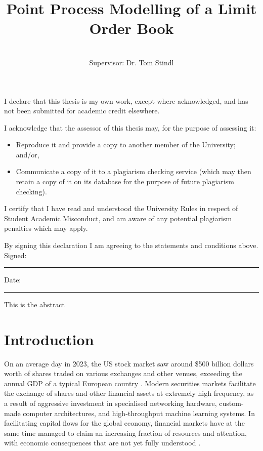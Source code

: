 \documentclass[honours,12pt]{unswthesis}
\title{Point Process Modelling of a Limit Order Book}
\author{\Authornameonly\\{\bigskip}Supervisor: Dr. Tom Stindl}
\newcommand\blankpage{%
    \null
    \thispagestyle{empty}%
    \addtocounter{page}{-1}%
    \newpage}
\numberwithin{equation}{section}
\begin{document}
\beforepreface

\afterpage{\blankpage}



\vskip 10pc \noindent I declare that this thesis is my
own work, except where acknowledged, and has not been submitted for
academic credit elsewhere. 

\vskip 2pc  \noindent I acknowledge that the assessor of this
thesis may, for the purpose of assessing it:
\begin{itemize}
\item Reproduce it and provide a copy to another member of the University; and/or,
\item Communicate a copy of it to a plagiarism checking service (which may then retain a copy of it on its database for the purpose of future plagiarism checking).
\end{itemize}

\vskip 2pc \noindent I certify that I have read and understood the University Rules in
respect of Student Academic Misconduct, and am aware of any potential plagiarism penalties which may 
apply.\vspace{24pt}

\vskip 2pc \noindent By signing 
this declaration I am
agreeing to the statements and conditions above.
\vskip 2pc \noindent
Signed: \rule{7cm}{0.25pt} \hfill Date: \rule{4cm}{0.25pt} \newline
\vskip 1pc

\afterpage{\blankpage}




\afterpage{\blankpage}



This is the abstract
\afterpage{\blankpage}


\afterpreface

\afterpage{\blankpage}

\chapter{Introduction}\label{s-intro}

On an average day in 2023, the US stock market saw around \$500 billion dollars worth of shares traded on various exchanges and other venues, exceeding the annual GDP of a typical European country \cite{FINRA2024}. Modern securities markets facilitate the exchange of shares and other financial assets at extremely high frequency, as a result of aggressive investment in specialised networking hardware, custom-made computer architectures, and high-throughput machine learning systems. In facilitating capital flows for the global economy, financial markets have at the same time managed to claim an increasing fraction of resources and attention, with economic consequences that are not yet fully understood \cite{Palley2007}.
\end{document}
